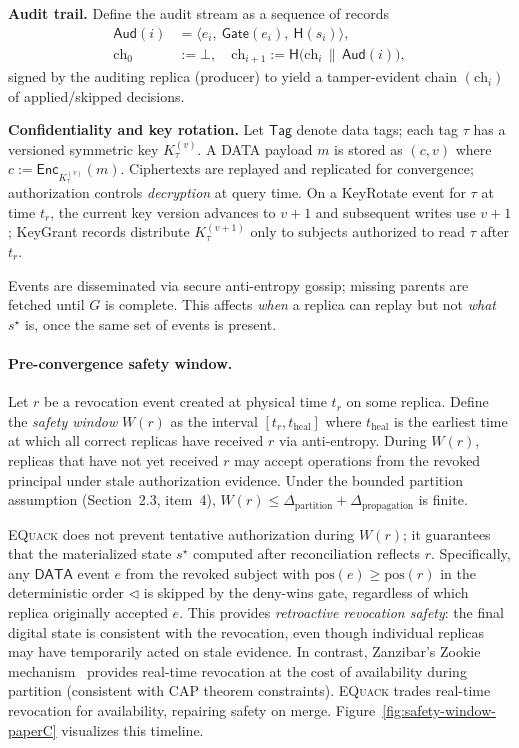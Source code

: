 \documentclass[10pt,journal,compsoc]{IEEEtran}
\newcommand{\equack}{\textsc{EQuack}}
\begin{document}
\medskip
\noindent\textbf{Audit trail.}
Define the audit stream as a sequence of records
\[
\begin{aligned}
\mathsf{Aud}(i) &= \big\langle e_i,\ \mathsf{Gate}(e_i),\ \mathsf{H}(s_i)\big\rangle,\\
\mathrm{ch}_0 &:= \bot,\quad
\mathrm{ch}_{i+1} := \mathsf{H}\!\big(\mathrm{ch}_i \,\|\, \mathsf{Aud}(i)\big),
\end{aligned}
\]
signed by the auditing replica (producer) to yield a tamper-evident chain $(\mathrm{ch}_i)$ of applied/skipped decisions.

\medskip
\noindent\textbf{Confidentiality and key rotation.}
Let $\mathsf{Tag}$ denote data tags; each tag $\tau$ has a versioned symmetric key $K_{\tau}^{(v)}$. A DATA payload $m$ is stored as $(c,v)$ where $c := \mathsf{Enc}_{K_{\tau}^{(v)}}(m)$. Ciphertexts are replayed and replicated for convergence; authorization controls \emph{decryption} at query time. On a KeyRotate event for $\tau$ at time $t_r$, the current key version advances to $v{+}1$ and subsequent writes use $v{+}1$; KeyGrant records distribute $K_{\tau}^{(v+1)}$ only to subjects authorized to read $\tau$ after $t_r$.

Events are disseminated via secure anti-entropy gossip; missing parents are fetched until $G$ is complete.
This affects \emph{when} a replica can replay but not \emph{what} $s^\star$ is, once the same set of events is present.

\paragraph{Pre-convergence safety window.} Let $r$ be a revocation event created at physical time $t_r$ on some replica. Define the \emph{safety window} $W(r)$ as the interval $[t_r, t_{\text{heal}}]$ where $t_{\text{heal}}$ is the earliest time at which all correct replicas have received $r$ via anti-entropy. During $W(r)$, replicas that have not yet received $r$ may accept operations from the revoked principal under stale authorization evidence. Under the bounded partition assumption (Section~2.3, item~4), $W(r) \leq \Delta_{\text{partition}} + \Delta_{\text{propagation}}$ is finite.

\equack{} does not prevent tentative authorization during $W(r)$; it guarantees that the materialized state $s^\star$ computed after reconciliation reflects $r$. Specifically, any $\mathsf{DATA}$ event $e$ from the revoked subject with $\mathrm{pos}(e) \geq \mathrm{pos}(r)$ in the deterministic order $\triangleleft$ is skipped by the deny-wins gate, regardless of which replica originally accepted $e$. This provides \emph{retroactive revocation safety}: the final digital state is consistent with the revocation, even though individual replicas may have temporarily acted on stale evidence. In contrast, Zanzibar's Zookie mechanism~\cite{zanzibar2019} provides real-time revocation at the cost of availability during partition (consistent with CAP theorem constraints). \equack{} trades real-time revocation for availability, repairing safety on merge. Figure~\ref{fig:safety-window-paperC} visualizes this timeline.
\end{document}

